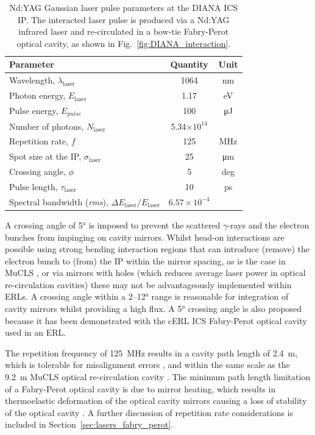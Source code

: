 \documentclass[../main.tex]{subfiles}
\begin{document}
\begin{table}[!h]
\centering
\caption{Nd:YAG Gaussian laser pulse parameters at the DIANA ICS IP. The interacted laser pulse is produced via a Nd:YAG infrared laser and re-circulated in a bow-tie Fabry-Perot optical cavity, as shown in Fig.~\ref{fig:DIANA_interaction}.}
\vspace{3mm}
\begin{tabular}{lcc}
\hline\hline
Parameter & Quantity & Unit \\
\hline
Wavelength, $\lambda_\textrm{laser}$ & 1064 & \si{\nano\meter}\\
Photon energy, $E_\textrm{laser}$ & 1.17 & \si{\electronvolt}\\
Pulse energy, $E_{pulse}$  & 100 & \si{\micro\joule}\\
Number of photons, $N_{\textrm{laser}}$ & 5.34$\times 10^{14}$ & \\ 
Repetition rate, $f$ & 125 & \si{\mega\hertz}\\
Spot size at the IP, $\sigma_\textrm{laser}$ & 25 & \si{\micro\meter}\\
Crossing angle, $\phi$ & 5 & deg \\
Pulse length, $\tau_{\mathrm{laser}}$  & 10 & \si{\pico\second}\\
Spectral bandwidth (\textit{rms}), $\Delta E_\textrm{laser}/E_\textrm{laser}$ & $6.57\times 10^{-4}$ &   \\
\hline\hline
\end{tabular}
\label{tab:DIANA_laser_pulse_design_parameters}
\end{table}

A crossing angle of 5\si{\degree} is imposed to prevent the scattered $\gamma$-rays and the electron bunches from impinging on cavity mirrors. Whilst head-on interactions are possible using strong bending interaction regions that can introduce (remove) the electron bunch to (from) the IP within the mirror spacing, as is the case in MuCLS \cite{eggl2016munich}, or via mirrors with holes (which reduces average laser power in optical re-circulation cavities) these may not be advantageously implemented within ERLs. A crossing angle within a 2--12\si{\degree} range is reasonable for integration of cavity mirrors \cite{variola2011luminosity} whilst providing a high flux. A 5\si{\degree} crossing angle is also proposed because it has been demonstrated with the cERL ICS \cite{akagi2016narrow} Fabry-Perot optical cavity used in an ERL. 

The repetition frequency of 125~\si{\mega\hertz} results in a cavity path length of 2.4~\si{\meter}, which is tolerable for misalignment errors \cite{zomer2009polarization}, and within the same scale as the 9.2~\si{\meter} MuCLS optical re-circulation cavity \cite{eggl2016munich}. The minimum path length limitation of a Fabry-Perot optical cavity is due to mirror heating, which results in thermoelastic deformation of the optical cavity mirrors causing a loss of stability of the optical cavity \cite{chaikovska2016high}. A further discussion of repetition rate considerations is included in Section~\ref{sec:lasers_fabry_perot}.   
\end{document}
